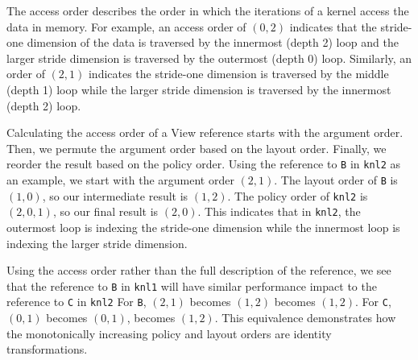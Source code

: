 \documentclass[sigconf, table]{acmart}
\begin{document}
The access order describes the order in which the iterations of a kernel access the data in memory.
For example, an access order of $(0,2)$ indicates that the stride-one dimension of the data is traversed by the innermost (depth 2) loop and the larger stride dimension is traversed by the outermost (depth 0) loop. 
Similarly, an order of $(2,1)$ indicates the stride-one dimension is traversed by the middle (depth 1) loop while the larger stride dimension is traversed by the innermost (depth 2) loop.

Calculating the access order of a View reference starts with the argument order.
Then, we permute the argument order based on the layout order. 
Finally, we reorder the result based on the policy order.
Using the reference to \verb.B. in \verb.knl2. as an example, we start with the argument order $(2,1)$.
The layout order of \verb.B. is $(1,0)$, so our intermediate result is $(1,2)$. 
The policy order of \verb.knl2. is $(2,0,1)$, so our final result is $(2,0)$. 
This indicates that in \verb.knl2., the outermost loop is indexing the stride-one dimension while the innermost loop is indexing the larger stride dimension.

Using the access order rather than the full description of the reference, we see that the reference to \verb.B. in \verb.knl1. will have similar performance impact to the reference to \verb.C. in \verb.knl2.
For \verb.B., $(2,1)$ becomes $(1,2)$ becomes $(1,2)$. 
For \verb.C., $(0,1)$ becomes $(0,1)$, becomes $(1,2)$.
This equivalence demonstrates how the monotonically increasing policy and layout orders are identity transformations.
\end{document}
